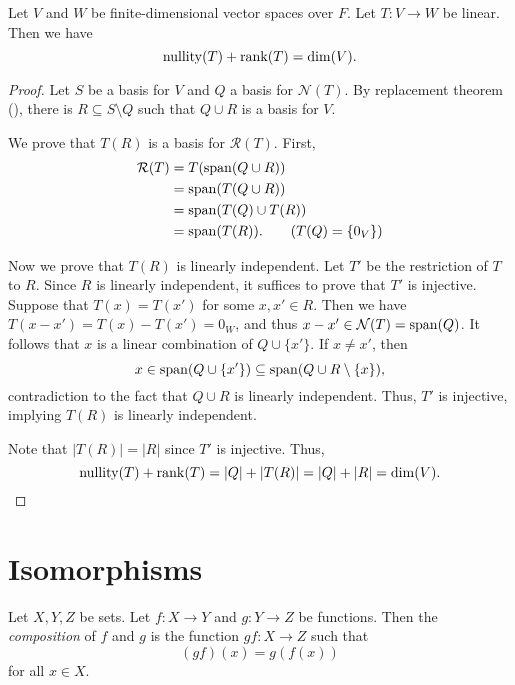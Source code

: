 \begin{theorem}
  \label{thm:rank-nullity}
  Let $V$ and $W$ be finite-dimensional vector spaces over $F$.
  Let $T: V \to W$ be linear.
  Then we have
  \begin{equation*}
    \operatorname{nullity}(T) + \operatorname{rank}(T) = \dim(V).
  \end{equation*}
\end{theorem}
\begin{proof}
  Let $S$ be a basis for $V$ and $Q$ a basis for $\mathcal{N}(T)$.
  By replacement theorem (), there is
  $R \subseteq S \setminus Q$ such that $Q \cup R$ is a basis for $V$.
  
  We prove that $T(R)$ is a basis for $\mathcal{R}(T)$.
  First,
  \begin{align*}
    \mathcal{R}(T)
    &= T(\spn(Q \cup R)) \\
    &= \spn(T(Q \cup R)) \\
    &= \spn(T(Q) \cup T(R)) \\
    &= \spn(T(R)). \tag{$T(Q) = \{0_V\}$}
  \end{align*}

  Now we prove that $T(R)$ is linearly independent.
  Let $T'$ be the restriction of $T$ to $R$.
  Since $R$ is linearly independent, it suffices to prove that $T'$ is
  injective.
  Suppose that $T(x) = T(x')$ for some $x, x' \in R$.
  Then we have $T(x - x') = T(x) - T(x') = 0_W$, and thus
  $x - x' \in \mathcal{N}(T) = \operatorname{span}(Q)$.
  It follows that $x$ is a linear combination of $Q \cup \{x'\}$.
  If $x \neq x'$, then
  \begin{equation*}
    x \in \operatorname{span}(Q \cup \{x'\}) \subseteq \operatorname{span}(Q \cup R \setminus \{x\}),
  \end{equation*}
  contradiction to the fact that $Q \cup R$ is linearly independent.
  Thus, $T'$ is injective, implying $T(R)$ is linearly independent.

  Note that $|T(R)| = |R|$ since $T'$ is injective.
  Thus,
  \begin{equation*}
    \operatorname{nullity}(T) + \operatorname{rank}(T)
    = |Q| + |T(R)|
    = |Q| + |R|
    = \dim(V).
    \qedhere
  \end{equation*}
\end{proof}

\section{Isomorphisms}
\begin{definition}
  \label{def:composition}
  Let $X, Y, Z$ be sets.
  Let $f: X \to Y$ and $g: Y \to Z$ be functions.
  Then the \emph{composition} of $f$ and $g$ is the function $gf: X \to Z$ such
  that
  \begin{equation*}
    (gf)(x) = g(f(x))
  \end{equation*}
  for all $x \in X$.
\end{definition}

